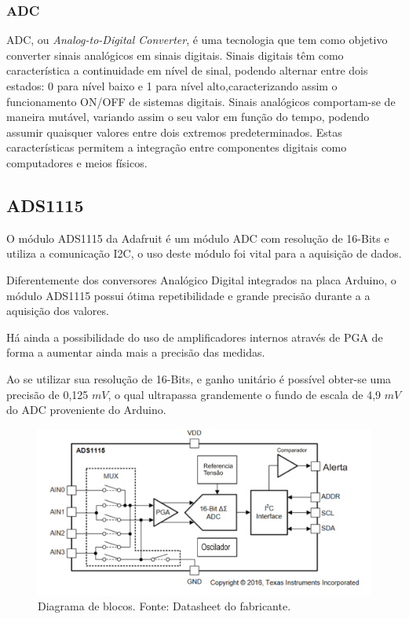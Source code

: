 \subsubsection{ADC}

ADC, ou \textit{Analog-to-Digital Converter}, é uma tecnologia que tem como objetivo converter sinais analógicos em sinais digitais. Sinais digitais têm como característica a continuidade em nível de sinal, podendo alternar entre dois estados: 0 para nível baixo e 1 para nível alto,caracterizando assim o funcionamento ON/OFF de sistemas digitais.
 Sinais analógicos comportam-se de maneira mutável, variando assim o seu valor em função do tempo, podendo assumir quaisquer valores entre dois extremos predeterminados. Estas características permitem a integração entre componentes digitais como computadores e meios físicos.

\subsection{ADS1115}
O módulo ADS1115 da Adafruit é um módulo ADC com resolução de 16-Bits e utiliza a comunicação I2C, o uso deste módulo foi vital para a aquisição de dados.

Diferentemente dos conversores Analógico Digital integrados na placa Arduino, o módulo ADS1115 possui ótima repetibilidade e grande precisão durante a a aquisição dos valores.

Há ainda a possibilidade do uso de amplificadores internos através de PGA de forma a aumentar ainda mais a precisão das medidas.

Ao se utilizar sua resolução de 16-Bits, e ganho unitário é possível obter-se uma precisão de 0,125 $mV$, o qual ultrapassa grandemente o fundo de escala de 4,9 $mV$ do ADC proveniente do Arduino.%
\FloatBarrier
\begin{figure}[!htbp]
	\centering
	\includegraphics[scale=0.7]{imagens/ADS}
	\caption{Diagrama de blocos. Fonte: Datasheet do fabricante. }%
	
	\label{fig:Ads}
\end{figure}
\FloatBarrier

